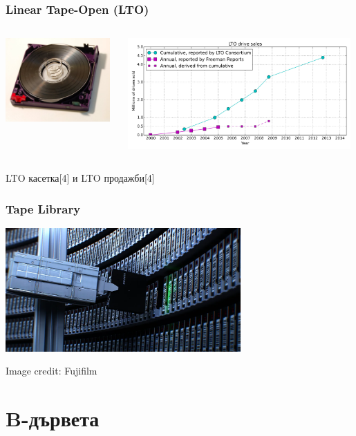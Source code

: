 \documentclass{beamer}
\begin{document}
\begin{frame}[fragile]
  \frametitle{Linear Tape-Open (LTO)}

\begin{columns}
  \begin{column}{0.3\textwidth}
      \includegraphics[width=4cm]{images/lto_cartridge}
  \end{column}
  \begin{column}{0.7\textwidth}
       \includegraphics[width=8.5cm]{images/lto_sales}
  \end{column}
\end{columns}
\bigskip
\centerline{LTO касетка[4] и LTO продажби[4]}
\end{frame}


\begin{frame}[fragile]
  \frametitle{Tape Library}

\begin{center}
  \includegraphics[width=9cm]{images/fujifilm}
  
  \bigskip
  Image credit: Fujifilm  
\end{center}

\end{frame}

\section{B-дървета}
\end{document}
